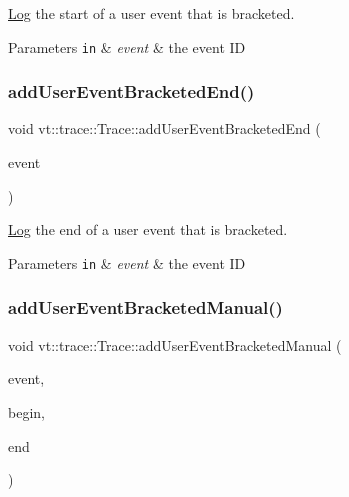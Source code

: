 \hyperlink{structvt_1_1trace_1_1_log}{Log} the start of a user event that is bracketed. 


\begin{DoxyParams}[1]{Parameters}
\mbox{\tt in}  & {\em event} & the event ID \\
\hline
\end{DoxyParams}
\mbox{\label{structvt_1_1trace_1_1_trace_a9ed44cd0fb5939013ae30de2aeb8aa0e}} 
\subsubsection{\texorpdfstring{add\+User\+Event\+Bracketed\+End()}{addUserEventBracketedEnd()}}
{\footnotesize\ttfamily void vt\+::trace\+::\+Trace\+::add\+User\+Event\+Bracketed\+End (\begin{DoxyParamCaption}\item[{\hyperlink{namespacevt_1_1trace_a5908920d051c144c89f17c69ed262350}{User\+Event\+I\+D\+Type}}]{event }\end{DoxyParamCaption})}



\hyperlink{structvt_1_1trace_1_1_log}{Log} the end of a user event that is bracketed. 


\begin{DoxyParams}[1]{Parameters}
\mbox{\tt in}  & {\em event} & the event ID \\
\hline
\end{DoxyParams}
\mbox{\label{structvt_1_1trace_1_1_trace_a2b60820d8b8d4eb8b5b4682aff5039bc}} 
\subsubsection{\texorpdfstring{add\+User\+Event\+Bracketed\+Manual()}{addUserEventBracketedManual()}}
{\footnotesize\ttfamily void vt\+::trace\+::\+Trace\+::add\+User\+Event\+Bracketed\+Manual (\begin{DoxyParamCaption}\item[{\hyperlink{namespacevt_1_1trace_a70c43e0e1596eea236912d4197d3120a}{User\+Spec\+Event\+I\+D\+Type}}]{event,  }\item[{\hyperlink{namespacevt_a2b9f28078dc309ad0706b69ded743e69}{Time\+Type}}]{begin,  }\item[{\hyperlink{namespacevt_a2b9f28078dc309ad0706b69ded743e69}{Time\+Type}}]{end }\end{DoxyParamCaption})}



